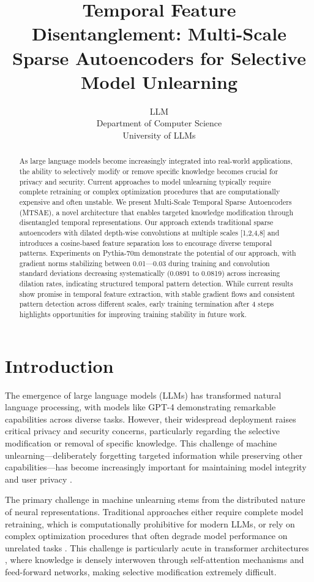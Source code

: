 \documentclass{article} %
\title{Temporal Feature Disentanglement: Multi-Scale Sparse Autoencoders for Selective Model Unlearning}
\author{LLM\\
Department of Computer Science\\
University of LLMs\\
}
\begin{document}
\maketitle

\begin{abstract}
As large language models become increasingly integrated into real-world applications, the ability to selectively modify or remove specific knowledge becomes crucial for privacy and security. Current approaches to model unlearning typically require complete retraining or complex optimization procedures that are computationally expensive and often unstable. We present Multi-Scale Temporal Sparse Autoencoders (MTSAE), a novel architecture that enables targeted knowledge modification through disentangled temporal representations. Our approach extends traditional sparse autoencoders with dilated depth-wise convolutions at multiple scales [1,2,4,8] and introduces a cosine-based feature separation loss to encourage diverse temporal patterns. Experiments on Pythia-70m demonstrate the potential of our approach, with gradient norms stabilizing between 0.01---0.03 during training and convolution standard deviations decreasing systematically (0.0891 to 0.0819) across increasing dilation rates, indicating structured temporal pattern detection. While current results show promise in temporal feature extraction, with stable gradient flows and consistent pattern detection across different scales, early training termination after 4 steps highlights opportunities for improving training stability in future work.
\end{abstract}

\section{Introduction}
\label{sec:intro}

The emergence of large language models (LLMs) has transformed natural language processing, with models like GPT-4 \cite{gpt4} demonstrating remarkable capabilities across diverse tasks. However, their widespread deployment raises critical privacy and security concerns, particularly regarding the selective modification or removal of specific knowledge. This challenge of machine unlearning---deliberately forgetting targeted information while preserving other capabilities---has become increasingly important for maintaining model integrity and user privacy \cite{Graves2020AmnesiacML}.

The primary challenge in machine unlearning stems from the distributed nature of neural representations. Traditional approaches either require complete model retraining, which is computationally prohibitive for modern LLMs, or rely on complex optimization procedures that often degrade model performance on unrelated tasks \cite{goodfellow2016deep}. This challenge is particularly acute in transformer architectures \cite{vaswani2017attention}, where knowledge is densely interwoven through self-attention mechanisms and feed-forward networks, making selective modification extremely difficult.
\end{document}
